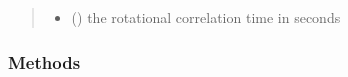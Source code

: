 \documentclass[a4paper,10pt,english,openany,oneside]{sphinxmanual}
\begin{document}
\begin{fulllineitems}
\begin{fulllineitems}
\begin{quote}
\begin{description}
\begin{itemize}
\item {} 
\sphinxAtStartPar
{} () \textendash{} the rotational correlation time in seconds

\end{itemize}

\end{description}\end{quote}
\subsubsection*{Methods}


\begin{savenotes}\sphinxatlongtablestart\begin{longtable}[c]{}
\hline

\endfirsthead

%
{}\\
\hline

\endhead

\hline
{}\\
\endfoot

\endlastfoot


\end{longtable}
\end{savenotes}
\end{fulllineitems}
\end{fulllineitems}
\end{document}
